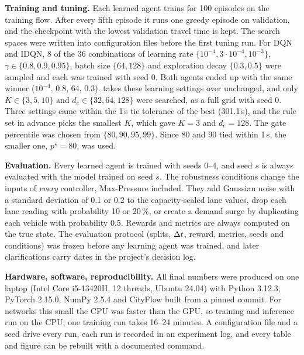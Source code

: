 \textbf{Training and tuning.} Each learned agent trains for 100 episodes on the training
flow. After every fifth episode it runs one greedy episode on validation, and the checkpoint
with the lowest validation travel time is kept. The search spaces were written into
configuration files before the first tuning run. For DQN and IDQN, 8 of the 36
combinations of learning rate $\{10^{-4},3{\cdot}10^{-4},10^{-3}\}$,
$\gamma\in\{0.8,0.9,0.95\}$, batch size $\{64,128\}$ and exploration decay $\{0.3,0.5\}$ were
sampled and each was trained with seed 0. Both agents ended up with the same winner ($10^{-4}$, 0.8, 64, 0.3).
\ugmarl{} takes these learning settings over unchanged, and only $K\in\{3,5,10\}$ and
$d_e\in\{32,64,128\}$ were searched, as a full grid with seed 0. Three settings came within
the 1\,s tie tolerance of the best (301.1\,s), and the rule set in advance picks the smallest
$K$, which gave $K=3$ and $d_e=128$. The gate percentile was chosen from $\{80,90,95,99\}$. Since
80 and 90 tied within 1\,s, the smaller one, $p^\star=80$, was used.

\textbf{Evaluation.} Every learned agent is trained with seeds 0--4, and seed $s$ is always
evaluated with the model trained on seed $s$. The robustness conditions change the inputs of
\emph{every} controller, Max-Pressure included. They add Gaussian noise with a standard
deviation of 0.1 or 0.2 to the capacity-scaled lane values, drop each lane reading with
probability 10 or 20\,\%, or create a demand surge by duplicating each vehicle with
probability 0.5. Rewards and metrics are always computed on the true state. The evaluation
protocol (splits, $\Delta t$, reward, metrics, seeds and conditions) was frozen before any learning
agent was trained, and later clarifications carry dates in the project's decision log.

\textbf{Hardware, software, reproducibility.} All final numbers were produced on one laptop
(Intel Core i5-13420H, 12 threads, Ubuntu 24.04) with Python 3.12.3, PyTorch 2.15.0, NumPy
2.5.4 and CityFlow built from a pinned commit. For networks this small the CPU was faster than
the GPU, so training and inference run on the CPU; one training run takes 16--24 minutes. A
configuration file and a seed drive every run, each run is recorded in an experiment log, and
every table and figure can be rebuilt with a documented command.
